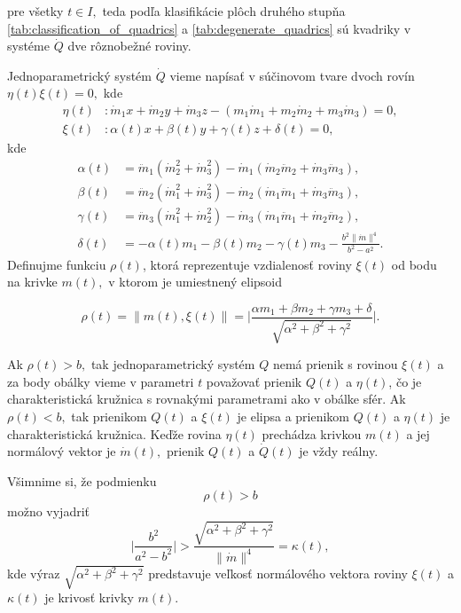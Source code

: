 pre všetky $t \in I,$
teda podľa klasifikácie plôch druhého stupňa \ref{tab:classification_of_quadrics} a \ref{tab:degenerate_quadrics} sú kvadriky v systéme $\dot{Q}$ dve rôznobežné roviny.

Jednoparametrický systém $\dot{Q}$ vieme napísať v súčinovom tvare dvoch rovín $ \eta (t) \xi (t) = 0,$
kde 
\begin{align*}
\eta(t) & \colon \dot{m}_1 x + \dot{m}_2 y + \dot{m}_3 z - (m_1 \dot{m}_1 + m_2 \dot{m}_2 + m_3 \dot{m}_3) = 0, \\
\xi(t) & \colon  \alpha (t) x + \beta (t) y + \gamma (t) z + \delta (t) = 0, 
\end{align*}
kde 
\begin{align*}
\alpha (t) &= \ddot{m}_1 (\dot{m}_2^2 + \dot{m}_3^2) - \dot{m}_1(\dot{m}_2 \ddot{m}_2 + \dot{m}_3 \ddot{m}_3) , \\
\beta (t) &= \ddot{m}_2 (\dot{m}_1^2 + \dot{m}_3^2) - \dot{m}_2(\dot{m}_1 \ddot{m}_1 + \dot{m}_3 \ddot{m}_3), \\
\gamma (t) &= \ddot{m}_3 (\dot{m}_1^2 + \dot{m}_2^2) - \dot{m}_3(\dot{m}_1 \ddot{m}_1 + \dot{m}_2 \ddot{m}_2), \\
\delta (t) &= - \alpha (t) m_1 - \beta (t) m_2 - \gamma (t) m_3 - \frac{b^2 \| \dot{m} \|^4 }{b^2 - a^2}.
\end{align*}
Definujme funkciu $\rho(t)$, ktorá reprezentuje vzdialenosť roviny $\xi(t)$ od bodu na krivke $m(t),$ v ktorom je umiestnený elipsoid

$$
\rho (t) = \| m(t), \xi(t) \|= \bigg|  \frac{\alpha m_1 + \beta m_2 + \gamma m_3 + \delta}{\sqrt{\alpha^2 + \beta^2 + \gamma^2}} \bigg|.
$$

Ak $\rho(t) > b,$ tak jednoparametrický systém $Q$ nemá prienik s rovinou $\xi(t) $ a za body obálky vieme v parametri $t$ považovať prienik $Q(t)$ a $\eta(t)$, čo je charakteristická kružnica s rovnakými parametrami ako v obálke sfér. Ak $\rho(t) < b,$ tak prienikom $Q(t)$ a $\xi(t)$ je elipsa a prienikom $Q(t)$ a $\eta(t)$ je charakteristická kružnica. Keďže rovina $\eta(t)$ prechádza krivkou $m(t)$ a jej normálový vektor je $\dot{m}(t),$ prienik $Q(t)$ a $\dot{Q}(t)$ je vždy reálny.

Všimnime si, že podmienku
$$
\rho (t) > b 
$$
možno vyjadriť
$$
\bigg| \frac{b^2}{a^2 - b^2} \bigg| > \frac{\sqrt{\alpha^2 + \beta^2 + \gamma^2}}{\| \dot{m} \|^4} = \kappa (t),
$$
kde výraz $ \sqrt{\alpha^2 + \beta^2 + \gamma^2} $ predstavuje veľkosť normálového vektora roviny $\xi(t)$ a $\kappa(t)$ je krivosť krivky $m(t).$

